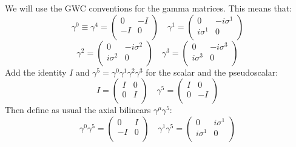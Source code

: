 \documentclass[a4paper,10pt]{article}
\begin{document}
We will use the GWC conventions for the gamma matrices. This means that:
\begin{displaymath}
 \gamma^{0}\equiv\gamma^{4} = \left(\begin{array}{cc}
 0 & -I \\
 -I & 0 \\
 \end{array}\right)
\quad \gamma^{1} = \left(\begin{array}{cc}
 0 & -i\sigma^{1} \\
 i\sigma^{1} & 0 \\
 \end{array}\right)
\end{displaymath}
\begin{displaymath}
\gamma^{2} = \left(\begin{array}{cc}
 0 & -i\sigma^{2} \\
 i\sigma^{2} & 0 \\
 \end{array}\right)
\quad \gamma^{3} = \left(\begin{array}{cc}
 0 & -i\sigma^{3} \\
 i\sigma^{3} & 0 \\
 \end{array}\right)
\end{displaymath}
Add the identity $I$ and $\gamma^{5}=\gamma^{0}\gamma^{1}\gamma^{2}\gamma^{3}$ for the scalar and the pseudoscalar:
\begin{displaymath}
 I = \left(\begin{array}{cc}
 I & 0 \\
 0 & I \\
 \end{array}\right)
\quad \gamma^{5} = \left(\begin{array}{cc}
 I & 0 \\
 0 & -I \\
 \end{array}\right)
\end{displaymath}
Then define as usual the axial bilinears $\gamma^{\mu}\gamma^{5}$:
\begin{displaymath}
 \gamma^{0}\gamma^{5} = \left(\begin{array}{cc}
 0 & I \\
 -I & 0 \\
 \end{array}\right)
\quad \gamma^{1}\gamma^{5} = \left(\begin{array}{cc}
 0 & i\sigma^{1} \\
 i\sigma^{1} & 0 \\
 \end{array}\right)
\end{displaymath}
\end{document}
